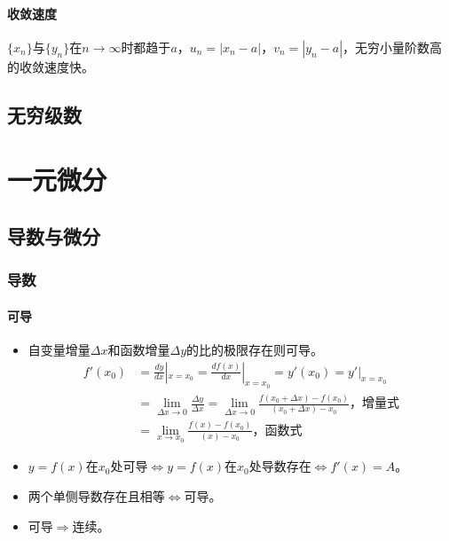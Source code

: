 \documentclass[
12pt, %
a4paper, 
oneside, %
]{scrartcl}
\begin{document}
\paragraph{收敛速度}
$ \{x_n\} $与$ \{y_n\} $在$ n \to \infty $时都趋于$ a $，$ u_n = |x_n - a| $，$ v_n = |y_n - a| $，无穷小量阶数高的收敛速度快。
\subsection[无穷级数]{无穷级数}
\section{一元微分}
\subsection[导数与微分]{导数与微分}
\subsubsection[导数]{导数}
\paragraph{可导}
\begin{itemize}
\item 自变量增量$ \Delta x $和函数增量$ \Delta y $的比的极限存在则可导。
\begin{align*}
f'(x_0) &= \frac{d y}{d x}|_{x = x_0} = \frac{d f(x)}{d x}|_{x = x_0} = y'(x_0) = y'|_{x = x_0} \\
&= \lim_{\Delta x \to 0} \frac{\Delta y}{\Delta x} = \lim_{\Delta x \to 0} \frac{f(x_0 + \Delta x) - f(x_0)}{(x_0 + \Delta x) - x_0} \text{，增量式} \\
&= \lim_{x \to x_0} \frac{f(x) - f(x_0)}{(x) - x_0} \text{，函数式}
\end{align*}
\item $ y = f(x) $在$ x_0 $处可导$ \Leftrightarrow $$ y = f(x) $在$ x_0 $处导数存在$ \Leftrightarrow $$ f'(x) = A $。
\item 两个单侧导数存在且相等$ \Leftrightarrow $可导。
\item 可导$ \Rightarrow $连续。
\end{itemize}
\end{document}
